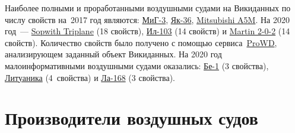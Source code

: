 
Наиболее полными и проработанными воздушными судами на Викиданных по числу свойств 
на~2017 год являются: \href{https://www.wikidata.org/wiki/Q271446}{МиГ-3}, 
\href{https://www.wikidata.org/wiki/Q1349098}{Як-36}, 
\href{https://www.wikidata.org/wiki/Q429839}{Mitsubishi A5M}. 
На 2020 год~--- \href{https://www.wikidata.org/wiki/Q770863}{Sopwith Triplane} (18 свойств), 
\href{https://www.wikidata.org/wiki/Q1658673}{Ил-103} (14 свойств) и 
\href{https://www.wikidata.org/wiki/Q665071}{Martin 2-0-2} (14 свойств).
Количество свойств было получено с помощью сервиса~\href{https://prowd.id/dashboards/972cd00ce110/profile}{ProWD}\autocite{aircraft_prowd}, 
анализирующем заданный объект Викиданных.
На 2020 год малоинформативными воздушными судами оказались: 
\href{https://www.wikidata.org/wiki/Q820603}{Бе-1} (3 свойства), 
\href{https://www.wikidata.org/wiki/Q117984}{Литуаника} (4~свойства) и 
\href{https://www.wikidata.org/wiki/Q572762}{Ла-168} (3 свойства).



\section{Производители воздушных судов}%
\marginnote{\MarginQuestion У каких из представленных ниже российских производителей самолётов есть веб-сайты?%
\begin{itemize}
\item \ruwiki{vDw}{МиГ}
\item \ruwiki{vDx}{Саратовский авиационный завод}
\item \ruwiki{vDy}{Туполев}
\item \ruwiki{vDz}{Сухой}
\end{itemize}
См. ответ~\ref{answer:aircraft_manufacturers} на с.~\pageref{answer:aircraft_manufacturers}.
}


